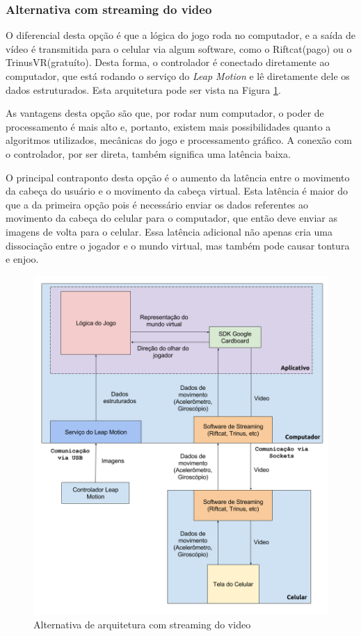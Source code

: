 \subsubsection{Alternativa com streaming do video}\label{subsubsec-arquiteturas-leapmotion-pc-riftcat-android}

O diferencial desta opção é que a lógica do jogo roda no computador, e a saída de vídeo é transmitida para o celular via algum software, como o Riftcat(pago) ou o TrinusVR(gratuíto). Desta forma, o controlador é conectado diretamente ao computador, que está rodando o serviço do \textit{Leap Motion} e lê diretamente dele os dados estruturados. Esta arquitetura pode ser vista na Figura \ref{fig:Arquitetura-leap-pc-riftcat-android}.

As vantagens desta opção são que, por rodar num computador, o poder de processamento é mais alto e, portanto, existem mais possibilidades quanto a algoritmos utilizados, mecânicas do jogo e processamento gráfico. A conexão com o controlador, por ser direta, também significa uma latência baixa. 

O principal contraponto desta opção é o aumento da latência entre o movimento da cabeça do usuário e o movimento da cabeça virtual. Esta latência é maior do que a da primeira opção pois é necessário enviar os dados referentes ao movimento da cabeça do celular para o computador, que então deve enviar as imagens de volta para o celular. Essa latência adicional não apenas cria uma dissociação entre o jogador e o mundo virtual, mas também pode causar tontura e enjoo.

\begin{figure}
	\centering
	\includegraphics[width=0.7\linewidth]{images/Arquitetura-leap-pc-riftcat-android}
	\caption{Alternativa de arquitetura com streaming do video}
	\label{fig:Arquitetura-leap-pc-riftcat-android}
\end{figure}

